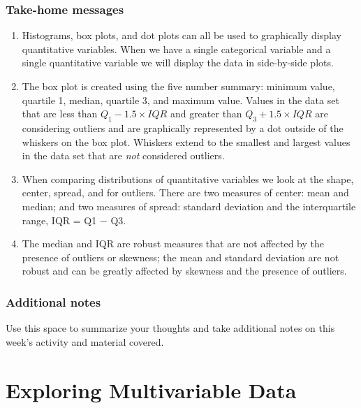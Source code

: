 \documentclass[
]{report}
\begin{document}
\vspace{0.5in}

\hypertarget{take-home-messages-3}{%
\subsection{Take-home messages}\label{take-home-messages-3}}

\begin{enumerate}
\def\labelenumi{\arabic{enumi}.}
\item
  Histograms, box plots, and dot plots can all be used to graphically display quantitative variables. When we have a single categorical variable and a single quantitative variable we will display the data in side-by-side plots.
\item
  The box plot is created using the five number summary: minimum value, quartile 1, median, quartile 3, and maximum value. Values in the data set that are less than \(Q_1 - 1.5 \times IQR\) and greater than \(Q_3 + 1.5\times IQR\) are considering outliers and are graphically represented by a dot outside of the whiskers on the box plot. Whiskers extend to the smallest and largest values in the data set that are \emph{not} considered outliers.
\item
  When comparing distributions of quantitative variables we look at the shape, center, spread, and for outliers. There are two measures of center: mean and median; and two measures of spread: standard deviation and the interquartile range, IQR = Q1 \(-\) Q3.
\item
  The median and IQR are robust measures that are not affected by the presence of outliers or skewness; the mean and standard deviation are not robust and can be greatly affected by skewness and the presence of outliers.
\end{enumerate}

\hypertarget{additional-notes-3}{%
\subsection{Additional notes}\label{additional-notes-3}}

Use this space to summarize your thoughts and take additional notes on this week's activity and material covered.

\hypertarget{exploring-multivariable-data}{%
\chapter{Exploring Multivariable Data}\label{exploring-multivariable-data}}
\end{document}
